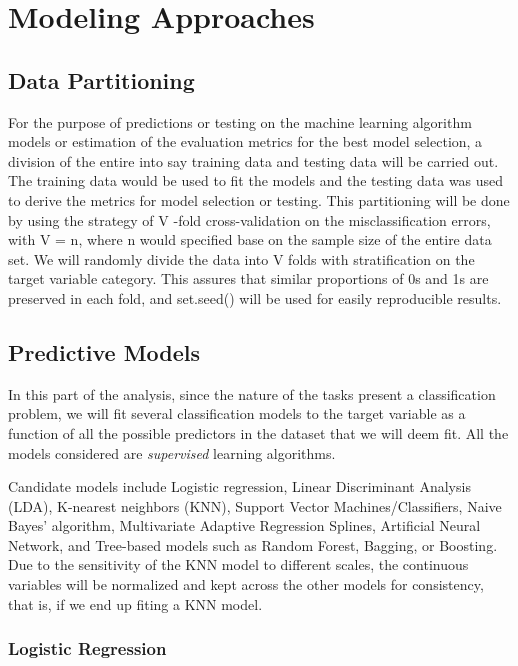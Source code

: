 \documentclass[
  10pt,
]{article}
\begin{document}
\section{Modeling Approaches}

\subsection{Data Partitioning}

For the purpose of predictions or testing on the machine learning algorithm models or estimation of the evaluation metrics for the best model selection, a division of the entire into say training data and testing data will be carried out. The training data would be used to fit the models and the testing data was used to derive the metrics for model selection or testing. This partitioning will be done by using the strategy of V -fold cross-validation on the misclassification errors, with V = n, where n would specified base on the sample size of the entire data set. We will randomly divide the data into V folds with stratification on the target variable category. This assures that similar proportions of 0s and 1s are preserved in each fold, and set.seed() will be used for easily reproducible results.

\subsection{Predictive Models}

In this part of the analysis, since the nature of the tasks present a classification problem, we will fit several classification models to the target variable as a function of all the possible predictors in the dataset that we will deem fit. All the models considered are \emph{supervised} learning algorithms.

Candidate models include Logistic regression, Linear Discriminant Analysis (LDA), K-nearest neighbors (KNN), Support Vector Machines/Classifiers, Naive Bayes' algorithm, Multivariate Adaptive Regression Splines, Artificial Neural Network, and Tree-based models such as Random Forest, Bagging, or Boosting. Due to the sensitivity of the KNN model to different scales, the continuous variables will be normalized and kept across the other models for consistency, that is, if we end up fiting a KNN model.

\subsubsection{Logistic Regression}
\end{document}
